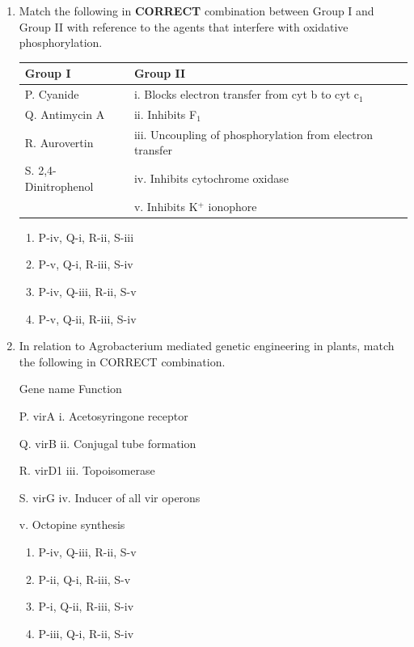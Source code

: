 \documentclass[journal,12pt,onecolumn]{IEEEtran}
\begin{document}
\begin{enumerate}[label=\arabic*.]
\item Match the following in \textbf{CORRECT} combination between Group I and Group II with reference to the agents that interfere with oxidative phosphorylation.

\begin{center}
\begin{tabular}{|l|l|}
\hline
Group I & Group II \\
\hline
P. Cyanide        & i. Blocks electron transfer from cyt b to cyt c$_1$ \\
Q. Antimycin A    & ii. Inhibits F$_1$ \\
R. Aurovertin     & iii. Uncoupling of phosphorylation from electron transfer \\
S. 2,4-Dinitrophenol & iv. Inhibits cytochrome oxidase \\
                  & v. Inhibits K$^+$ ionophore \\
\hline
\end{tabular}
\end{center}

\begin{multicols}{2}
\begin{enumerate}[label=(\Alph*)]
    \item P-iv, Q-i, R-ii, S-iii
    \item P-v, Q-i, R-iii, S-iv
    \item P-iv, Q-iii, R-ii, S-v
    \item P-v, Q-ii, R-iii, S-iv
\end{enumerate}
\end{multicols}
\item In relation to Agrobacterium mediated genetic engineering in plants, match the following in CORRECT combination.

Gene name \hspace{3cm} Function

P. virA \hspace{2.5cm} i. Acetosyringone receptor

Q. virB \hspace{2.5cm} ii. Conjugal tube formation

R. virD1 \hspace{2.3cm} iii. Topoisomerase

S. virG \hspace{2.7cm} iv. Inducer of all vir operons

\hspace{4.2cm} v. Octopine synthesis

\begin{multicols}{2}
\begin{enumerate}[label=(\Alph*)]
    \item P-iv, Q-iii, R-ii, S-v
    \item P-ii, Q-i, R-iii, S-v
    \item P-i, Q-ii, R-iii, S-iv
    \item P-iii, Q-i, R-ii, S-iv
\end{enumerate}
\end{multicols}


\end{enumerate}
\end{document}
